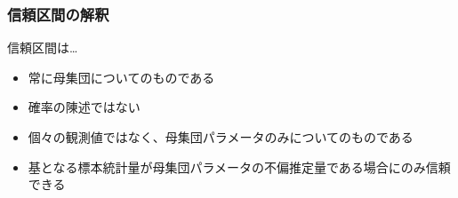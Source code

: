 
\begin{frame}
\frametitle{信頼区間の解釈}

信頼区間は…

\begin{itemize}

\item 常に母集団についてのものである

\item 確率の陳述ではない

\item 個々の観測値ではなく、母集団パラメータのみについてのものである

\item 基となる標本統計量が母集団パラメータの不偏推定量である場合にのみ信頼できる

\end{itemize}

\end{frame}


